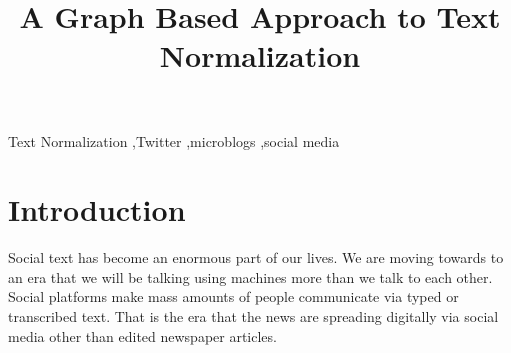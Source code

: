 \documentclass[preprint,review,12pt]{elsarticle}
\begin{document}
\begin{frontmatter}



\title{A Graph Based Approach to Text Normalization}


\author{}

\address{}

\begin{abstract}

\end{abstract}

\begin{keyword}
Text Normalization \sep Twitter \sep microblogs \sep social media

\end{keyword}

\end{frontmatter}



\section{Introduction}
\label{sec:introduction}

Social text has become an enormous part of our lives. We are moving towards to an era that we will be talking using machines more than we talk to each other. Social platforms make mass amounts of people communicate via typed or transcribed text. That is the era that the news are spreading digitally via social media other than edited newspaper articles.
\end{document}
